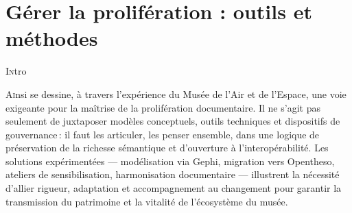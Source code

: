 \chapter[Gérer la prolifération]{\label{III-A} Gérer la prolifération : outils et méthodes}



\lettrine{I}ntro







\bigskip
\bigskip
\bigskip

\lettrine{A}insi se dessine, à travers l’expérience du Musée de l’Air et de l’Espace, une voie exigeante pour la maîtrise de la prolifération documentaire. Il ne s’agit pas seulement de juxtaposer modèles conceptuels, outils techniques et dispositifs de gouvernance : il faut les articuler, les penser ensemble, dans une logique de préservation de la richesse sémantique et d’ouverture à l’interopérabilité. Les solutions expérimentées — modélisation via Gephi, migration vers Opentheso, ateliers de sensibilisation, harmonisation documentaire — illustrent la nécessité d’allier rigueur, adaptation et accompagnement au changement pour garantir la transmission du patrimoine et la vitalité de l’écosystème du musée.